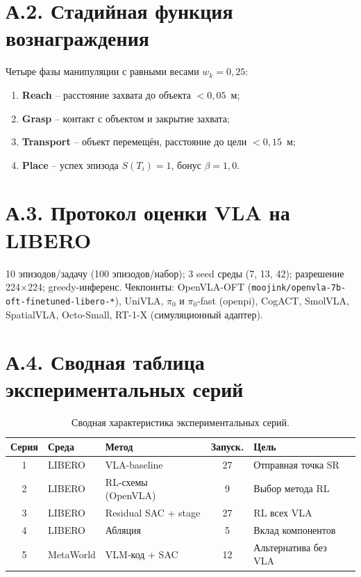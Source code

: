 \section*{А.2. Стадийная функция вознаграждения}

    Четыре фазы манипуляции с равными весами $w_k = 0{,}25$:
\begin{enumerate}
    \item \textbf{Reach} -- расстояние захвата до объекта $< 0{,}05$~м;
    \item \textbf{Grasp} -- контакт с объектом и закрытие захвата;
    \item \textbf{Transport} -- объект перемещён, расстояние до цели $< 0{,}15$~м;
    \item \textbf{Place} -- успех эпизода $S(T_i) = 1$, бонус $\beta = 1{,}0$.
\end{enumerate}

\section*{А.3. Протокол оценки VLA на LIBERO}

    10 эпизодов/задачу (100 эпизодов/набор); 3 seed среды (7, 13, 42); разрешение 224$\times$224; greedy-инференс. Чекпоинты: OpenVLA-OFT (\texttt{moojink/openvla-7b-oft-finetuned-libero-*}), UniVLA, $\pi_0$ и $\pi_0$-fast (openpi), CogACT, SmolVLA, SpatialVLA, Octo-Small, RT-1-X (симуляционный адаптер).

\section*{А.4. Сводная таблица экспериментальных серий}

\begin{table}[htbp]
\caption{Сводная характеристика экспериментальных серий.}
\label{tab:series_summary}
\label{tab:last}
\centering
\footnotesize
\setlength{\tabcolsep}{4pt}
\renewcommand{\arraystretch}{1.15}
\begin{tabularx}{\textwidth}{@{}c l l c >{\raggedright\arraybackslash}X@{}}
\toprule
\textbf{Серия} & \textbf{Среда} & \textbf{Метод} & \textbf{Запуск.} & \textbf{Цель} \\
\midrule
1 & LIBERO & VLA-baseline & 27 & Отправная точка SR \\
2 & LIBERO & RL-схемы (OpenVLA) & 9 & Выбор метода RL \\
3 & LIBERO & Residual SAC + stage & 27 & RL всех VLA \\
4 & LIBERO & Абляция & 5 & Вклад компонентов \\
5 & MetaWorld & VLM-код + SAC & 12 & Альтернатива без VLA \\
\bottomrule
\end{tabularx}
\end{table}

